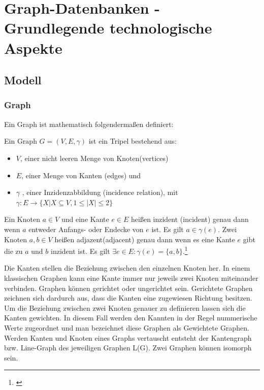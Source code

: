 \chapter{Graph-Datenbanken - Grundlegende technologische Aspekte}
\section{Modell}
\subsection{Graph}
Ein Graph ist mathematisch folgendermaßen definiert:
\begin{definition}
	Ein $\text{Graph}$ $G=(V,E,\gamma)$ ist ein Tripel bestehend aus:
	\begin{itemize}
		\item $V$, einer nicht leeren Menge von Knoten(vertices)
		\item $E$, einer Menge von Kanten (edges) und
		\item $\gamma$ , einer Inzidenzabbildung (incidence relation), mit\\
		$\gamma : E \longrightarrow \{X | X \subseteq V, 1 \leq |X| \leq 2\}$
	\end{itemize}
	Ein Knoten $a \in V$ und eine Kante $e \in E$ heißen inzident (incident)
	genau dann wenn $a$ entweder Anfangs- oder Endecke von $e$ ist. Es gilt $a \in \gamma(e)$. 
	Zwei Knoten $a,b \in V$ heißen adjazent(adjacent) genau dann wenn es eine Kante $e$ gibt die zu $a$ und $b$ inzident ist.
	Es gilt	$\exists e \in E: \gamma(e)=\{a,b\}$.\footnote{\cite[Seite 21]{pbeck01}} \\

\end{definition}
Die Kanten stellen die Beziehung zwischen den einzelnen Knoten her.
In einem klassischen Graphen kann eine Kante immer nur jeweils zwei Knoten miteinander verbinden.
Graphen können gerichtet oder ungerichtet sein. Gerichtete Graphen zeichnen sich dardurch aus, dass die Kanten eine zugewiesen Richtung besitzen.
Um die Beziehung zwischen zwei Knoten genauer zu definieren lassen sich die Kanten gewichten.
In diesem Fall werden den Kannten in der Regel nummerische Werte zugeordnet und man bezeichnet diese Graphen als Gewichtete Graphen.
Werden Kanten und Knoten eines Graphs vertauscht entsteht der Kantengraph bzw. Line-Graph des jeweiligen Graphen L(G).
Zwei Graphen können isomorph sein.

